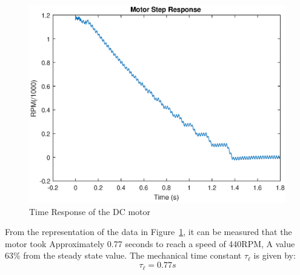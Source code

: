 \begin{figure}[h]
    \myfloatalign
    \includegraphics[width=1.2\textwidth]{gfx/Motor_shutoff} %
    \caption{Time Response of the DC motor}
    \label{fig:shutoff}
\end{figure}
From the representation of the data in Figure~\ref{fig:shutoff}, it can be measured that the motor took Approximately 0.77 seconds to reach a speed of 440RPM, A value 63\% from the steady state value. The mechanical time constant $\tau_\ell$ is given by:
\begin{equation}
	\tau_\ell = 0.77s
\end{equation}
